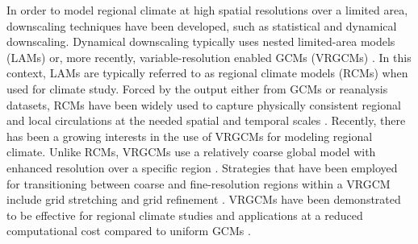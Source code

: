 \documentclass[draft,ms]{agutex}   %
\begin{document}
\begin{article}
In order to model regional climate at high spatial resolutions over a limited area, downscaling techniques have been developed, such as statistical and dynamical downscaling. Dynamical downscaling typically uses nested limited-area models (LAMs) or, more recently, variable-resolution enabled GCMs (VRGCMs) \citep{laprise2008regional}. In this context, LAMs are typically referred to as regional climate models (RCMs) when used for climate study. Forced by the output either from GCMs or reanalysis datasets, RCMs have been widely used to capture physically consistent regional and local circulations at the needed spatial and temporal scales \citep{christensen2007regional, bukovsky2009precipitation, mearns2012north}. Recently, there has been a growing interests in the use of VRGCMs for modeling regional climate. Unlike RCMs, VRGCMs use a relatively coarse global model with enhanced resolution over a specific region \citep{staniforth1978variable, fox1997finite}.  Strategies that have been employed for transitioning between coarse and fine-resolution regions within a VRGCM include grid stretching \citep{fox1997finite, mcgregor2008updated} and grid refinement \citep{ringler2008multiresolution, skamarock2012multiscale, zarzycki2014aquaplanet}. VRGCMs have been demonstrated to be effective for regional climate studies and applications at a reduced computational cost compared to uniform GCMs \citep{fox2006variable, rauscher2013exploring, zarzycki2015effects}. 


\end{article}
\end{document}
